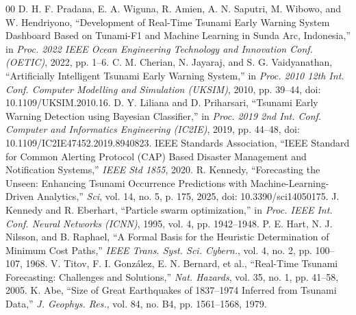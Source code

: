 \documentclass[conference]{IEEEtran}
\begin{document}
\begin{thebibliography}{00}
 D. H. F. Pradana, E. A. Wiguna, R. Amien, A. N. Saputri, M. Wibowo, and W. Hendriyono, ``Development of Real-Time Tsunami Early Warning System Dashboard Based on Tunami-F1 and Machine Learning in Sunda Arc, Indonesia,'' in \textit{Proc. 2022 IEEE Ocean Engineering Technology and Innovation Conf. (OETIC)}, 2022, pp. 1--6.
 C. M. Cherian, N. Jayaraj, and S. G. Vaidyanathan, ``Artificially Intelligent Tsunami Early Warning System,'' in \textit{Proc. 2010 12th Int. Conf. Computer Modelling and Simulation (UKSIM)}, 2010, pp. 39--44, doi: 10.1109/UKSIM.2010.16.
 D. Y. Liliana and D. Priharsari, ``Tsunami Early Warning Detection using Bayesian Classifier,'' in \textit{Proc. 2019 2nd Int. Conf. Computer and Informatics Engineering (IC2IE)}, 2019, pp. 44--48, doi: 10.1109/IC2IE47452.2019.8940823.
 IEEE Standards Association, ``IEEE Standard for Common Alerting Protocol (CAP) Based Disaster Management and Notification Systems,'' \textit{IEEE Std 1855}, 2020.
 R. Kennedy, ``Forecasting the Unseen: Enhancing Tsunami Occurrence Predictions with Machine-Learning-Driven Analytics,'' \textit{Sci}, vol. 14, no. 5, p. 175, 2025, doi: 10.3390/sci14050175.
 J. Kennedy and R. Eberhart, ``Particle swarm optimization,'' in \textit{Proc. IEEE Int. Conf. Neural Networks (ICNN)}, 1995, vol. 4, pp. 1942--1948.
 P. E. Hart, N. J. Nilsson, and B. Raphael, ``A Formal Basis for the Heuristic Determination of Minimum Cost Paths,'' \textit{IEEE Trans. Syst. Sci. Cybern.}, vol. 4, no. 2, pp. 100--107, 1968.
 V. Titov, F. I. Gonz{\'a}lez, E. N. Bernard, et al., ``Real-Time Tsunami Forecasting: Challenges and Solutions,'' \textit{Nat. Hazards}, vol. 35, no. 1, pp. 41--58, 2005.
 K. Abe, ``Size of Great Earthquakes of 1837--1974 Inferred from Tsunami Data,'' \textit{J. Geophys. Res.}, vol. 84, no. B4, pp. 1561--1568, 1979.
\end{thebibliography}
\end{document}
